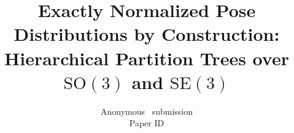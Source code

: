 \documentclass[10pt,twocolumn,letterpaper]{article}
\title{Exactly Normalized Pose Distributions by Construction:\\
Hierarchical Partition Trees over \texorpdfstring{$\mathrm{SO}(3)$}{SO(3)} and \texorpdfstring{$\mathrm{SE}(3)$}{SE(3)}}
\author{Anonymous \confName~submission\\
Paper ID \paperID\\
{\tt\small}
}
\begin{document}
\maketitle







{
    \small
    
    
}

\clearpage
\appendix

\end{document}
